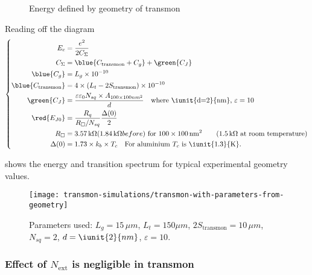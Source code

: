 \begin{figure}[h]
  \centering {}
  \caption{\small Energy defined by geometry of transmon\label{fig:cooper_pair_box_5_geometry}}
\end{figure}

Reading off the diagram
\begin{equation}
  \left\{
    \begin{aligned}
      E_c& = \frac{e^2}{2C_\Sigma}\\
      C_{\Sigma} & = \blue{C_\text{transmon} + C_g}+ \green{C_J}\\
      \blue{C_{g}} & = L_{g} \times 10^{-10}\\
      \blue{C_{\text{transmon}}} & = 4\times\left( L_{t} - 2S_{\text{transmon}} \right) \times 10^{-10}\\
      \green{C_J} & = \frac{\varepsilon\varepsilon_0N_{sq} \times A_{100\times100nm^2}}{d} \quad
      \text{where \iunit{d=2}{nm}, $\varepsilon = 10$}\\
      \red{E_{J0}} & = \frac{R_q}{R_{\square}/N_{sq}}\frac{\Delta(0)}{2}\\
      R_{\square} & = 3.57\,\text{k}\Omega (1.84\,\text{k}\Omega before) \text{ for }100 \times 100\,\text{nm}^2 \qquad (1.5\,\text{k}\Omega \text{ at room temperature})\\
      \Delta(0) & = 1.73 \times k_{b} \times T_{c} \quad \text{For aluminium $T_{c}$ is \iunit{1.3}{K}}.
    \end{aligned}\right.
\end{equation}

 shows the  energy and transition spectrum  for typical experimental
geometry values.

\begin{figure}[h]
  \centering \texttt{[image: transmon-simulations/transmon-with-parameters-from-geometry]}
  \caption{\small  Parameters used:  $L_{g}  = 15\,\mu  m$,  $L_{t} =  150\mu m$,  $2S_{\text{transmon}}  = 10\,\mu  m$,
    $N_{sq}=2$, $d = \iunit{2}{nm}$, $\varepsilon = 10$. \label{fig:transmon-with-parameters-from-geometry}}
\end{figure}

\subsubsection{Effect of $N_{\text{ext}}$ is negligible in transmon}
\label{sec:effect-n_textext}

